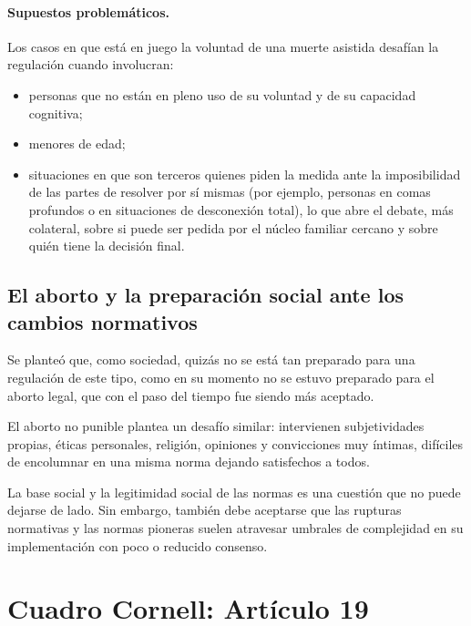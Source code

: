 \documentclass[12pt,oneside]{book}
\begin{document}
\paragraph{Supuestos problemáticos.} Los casos en que está en juego la voluntad de una muerte asistida desafían la regulación cuando involucran:

\begin{itemize}
    \item personas que no están en pleno uso de su voluntad y de su capacidad cognitiva;
    \item menores de edad;
    \item situaciones en que son terceros quienes piden la medida ante la imposibilidad de las partes de resolver por sí mismas (por ejemplo, personas en comas profundos o en situaciones de desconexión total), lo que abre el debate, más colateral, sobre si puede ser pedida por el núcleo familiar cercano y sobre quién tiene la decisión final.
\end{itemize}

\subsection{El aborto y la preparación social ante los cambios normativos}

Se planteó que, como sociedad, quizás no se está tan preparado para una regulación de este tipo, como en su momento no se estuvo preparado para el aborto legal, que con el paso del tiempo fue siendo más aceptado.

El aborto no punible plantea un desafío similar: intervienen subjetividades propias, éticas personales, religión, opiniones y convicciones muy íntimas, difíciles de encolumnar en una misma norma dejando satisfechos a todos.

\begin{important}
La base social y la legitimidad social de las normas es una cuestión que no puede dejarse de lado. Sin embargo, también debe aceptarse que las rupturas normativas y las normas pioneras suelen atravesar umbrales de complejidad en su implementación con poco o reducido consenso.
\end{important}

\section{Cuadro Cornell: Artículo 19}
\end{document}
